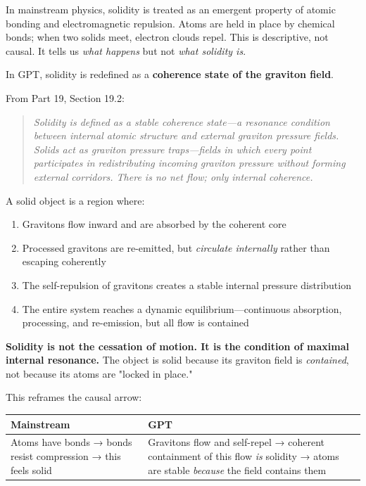 \documentclass[12pt, a4paper]{article}
\begin{document}
In mainstream physics, solidity is treated as an emergent property of atomic bonding and electromagnetic repulsion. Atoms are held in place by chemical bonds; when two solids meet, electron clouds repel. This is descriptive, not causal. It tells us \textit{what happens} but not \textit{what solidity is}.

In GPT, solidity is redefined as a \textbf{coherence state of the graviton field}.

From Part 19, Section 19.2:

\begin{quote}
\textit{Solidity is defined as a stable coherence state—a resonance condition between internal atomic structure and external graviton pressure fields. Solids act as graviton pressure traps—fields in which every point participates in redistributing incoming graviton pressure without forming external corridors. There is no net flow; only internal coherence.}
\end{quote}

A solid object is a region where:

\begin{enumerate}
    \item Gravitons flow inward and are absorbed by the coherent core
    \item Processed gravitons are re-emitted, but \textit{circulate internally} rather than escaping coherently
    \item The self-repulsion of gravitons creates a stable internal pressure distribution
    \item The entire system reaches a dynamic equilibrium—continuous absorption, processing, and re-emission, but all flow is contained
\end{enumerate}

\textbf{Solidity is not the cessation of motion. It is the condition of maximal internal resonance.} The object is solid because its graviton field is \textit{contained}, not because its atoms are "locked in place."

This reframes the causal arrow:

\begin{center}
\begin{tabular}{|p{5cm}|p{8cm}|}
\hline
\textbf{Mainstream} & \textbf{GPT} \\
\hline
Atoms have bonds → bonds resist compression → this feels solid & Gravitons flow and self-repel → coherent containment of this flow \textit{is} solidity → atoms are stable \textit{because} the field contains them \\
\hline
\end{tabular}
\end{center}
\end{document}
